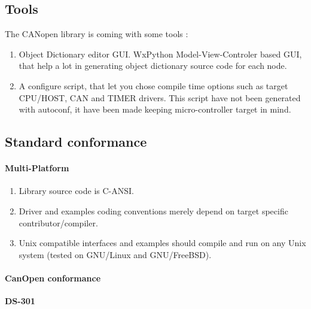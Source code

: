 \documentclass[a4paper,12pt]{book}
\newcommand\liststyleLii{%
\renewcommand\labelitemi{{--}}
\renewcommand\labelitemii{{--}}
\renewcommand\labelitemiii{{--}}
\renewcommand\labelitemiv{{--}}
}
\newcommand\liststyleLiii{%
\renewcommand\labelitemi{{--}}
\renewcommand\labelitemii{{--}}
\renewcommand\labelitemiii{{--}}
\renewcommand\labelitemiv{{--}}
}
\begin{document}
\subsection{Tools }
The CANopen library is coming with some tools :

\liststyleLii
\begin{enumerate}
\item Object Dictionary editor GUI. WxPython Model{}-View{}-Controler
based GUI, that help a lot in generating object dictionary source code
for each node.
\item A configure script, that let you chose compile time options such
as target CPU/HOST, CAN and TIMER drivers.\newline
This script have not been generated with autoconf, it have been made
keeping micro{}-controller target in mind.
\end{enumerate}
\subsection{Standard conformance}
\paragraph{Multi{}-Platform}
\liststyleLiii
\begin{enumerate}
\item Library source code is C{}-ANSI.
\item Driver and examples coding conventions merely depend on target
specific contributor/compiler.
\item Unix compatible interfaces and examples should compile and run on
any Unix system (tested on GNU/Linux and GNU/FreeBSD).
\end{enumerate}
\paragraph{CanOpen conformance}
{\bfseries\upshape
DS{}-301}
\end{document}
